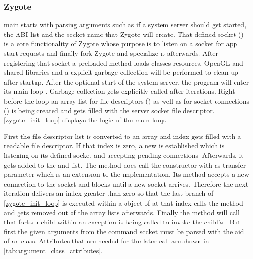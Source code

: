 \subsubsection{Zygote}\label{section:zygote}
 main starts with parsing arguments such as if a system
server should get started, the ABI list and the socket name that Zygote will
create. That defined socket () is a core functionality of Zygote whose purpose
is to listen on a socket for app start requests and finally fork Zygote and specialize it afterwards. After registering that socket a preloaded method loads classes
resources, OpenGL and shared libraries and a explicit garbage collection
 will be performed to clean up after startup. After the optional start of the system server, the program will enter its main loop
. Garbage collection gets explicitly called
after  iterations. Right before the loop an array list for file descriptors () as well as for socket connections () is being
created and  gets filled with the server socket file descriptor.
\autoref{zygote_init_loop} displays the logic of the main loop.



First the file descriptor list is converted to an array and index gets
filled with a readable file descriptor. If that index is zero,
a new  is established which is listening
on its defined socket and accepting pending connections.
Afterwards, it gets added to the 
and  list.
The  method does
call the  constructor with 
as transfer parameter which is an extension to the 
implementation. Its  method accepts a new connection
to the socket and blocks until a new socket arrives.
Therefore the next iteration delivers an index greater than zero so that
the last  branch of \autoref{zygote_init_loop} is executed within
a  object of  at that index calls
the  method and gets removed out of the array lists afterwards.
Finally the  method will call 
that forks a child within an exception is being called to invoke the child's
.
But first the given arguments from the command socket must be parsed with the
aid of an  class. Attributes that are needed for the later  call are shown in \autoref{tab:argument_class_attributes}.

